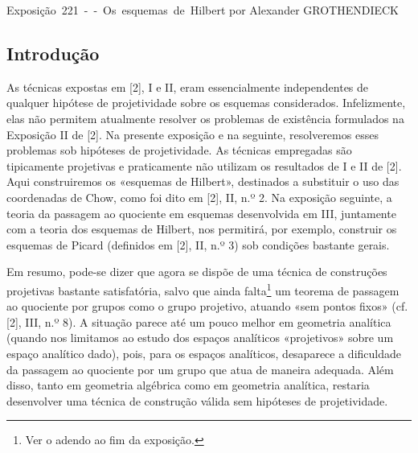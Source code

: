 \unit{Exposição 221 -- Os esquemas de Hilbert}
%
  {por Alexander GROTHENDIECK}

\subsection*{Introdução}

As técnicas expostas em [2], I e II, eram essencialmente independentes de
qualquer hipótese de projetividade sobre os esquemas considerados.
Infelizmente, elas não permitem atualmente resolver os problemas de existência
formulados na Exposição II de [2]. Na presente exposição e na seguinte,
resolveremos esses problemas sob hipóteses de projetividade. As técnicas
empregadas são tipicamente projetivas e praticamente não utilizam os
resultados de I e II de [2]. Aqui construiremos os «esquemas de Hilbert»,
destinados a substituir o uso das coordenadas de Chow, como foi dito em [2],
II, n.º 2. Na exposição seguinte, a teoria da passagem ao quociente em
esquemas desenvolvida em III, juntamente com a teoria dos esquemas de Hilbert,
nos permitirá, por exemplo, construir os esquemas de Picard (definidos em [2],
II, n.º 3) sob condições bastante gerais.

Em resumo, pode-se dizer que agora se dispõe de uma técnica de construções
projetivas bastante satisfatória, salvo que ainda falta\footnote{Ver o adendo
ao fim da exposição.} um teorema de passagem ao quociente por grupos como o
grupo projetivo, atuando «sem pontos fixos» (cf. [2], III, n.º 8). A situação
parece até um pouco melhor em geometria analítica (quando nos limitamos ao
estudo dos espaços analíticos «projetivos» sobre um espaço analítico dado),
pois, para os espaços analíticos, desaparece a dificuldade da passagem ao
quociente por um grupo que atua de maneira adequada. Além disso, tanto em
geometria algébrica como em geometria analítica, restaria desenvolver uma
técnica de construção válida sem hipóteses de projetividade.


